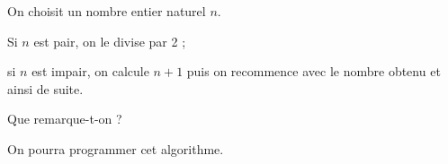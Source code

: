 
On choisit un nombre entier naturel $n$. 

Si $n$ est pair, on le divise par 2 ; 

si $n$ est impair, on calcule $n+1$ puis on recommence avec le nombre obtenu et ainsi de suite. 

Que remarque-t-on ?

On pourra programmer cet algorithme.